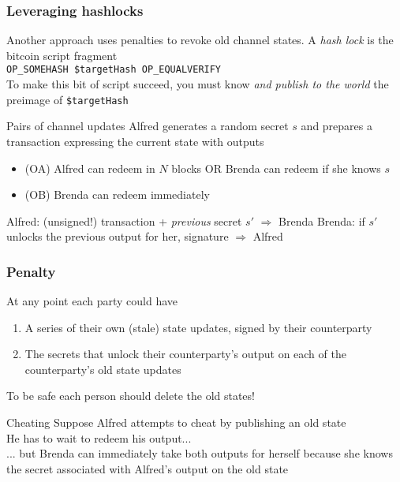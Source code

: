 \documentclass{beamer}
\begin{document}
\begin{frame}
	\frametitle{Leveraging hashlocks}
	Another approach uses penalties to revoke old channel states. \pause
	A \emph{hash lock} is the bitcoin script fragment \\
	{\tiny \texttt{OP\_SOMEHASH \$targetHash OP\_EQUALVERIFY}} \\ \pause
	To make this bit of script succeed, you must know \emph{and publish to the 
	world} the preimage of \texttt{\$targetHash} \pause
	\begin{block}{Pairs of channel updates}
		Alfred generates a random secret $ s $ and prepares a 
		transaction expressing the current state with outputs 
		\pause
		\begin{itemize}
			\item (OA) Alfred can redeem in $ N $ blocks OR Brenda can redeem if she 
				knows $ s $  \pause
			\item (OB) Brenda can redeem immediately \pause
		\end{itemize}
		Alfred:  (unsigned!) transaction + \emph{previous} secret $ s' $ $ \Rightarrow $ Brenda \pause
		Brenda: if $ s' $ unlocks the previous output for her, signature $ \Rightarrow $ Alfred
	\end{block}
\end{frame}
\begin{frame}
	\frametitle{Penalty}
	At any point each party could have \pause
	\begin{enumerate}
		\item A series of their own (stale) state updates, signed by their 
			counterparty \pause
		\item The secrets that unlock their counterparty's output on each of the 
			counterparty's old state updates \pause
	\end{enumerate}
	To be safe each person should delete the old states! \pause
	\begin{block}{Cheating}
	Suppose Alfred attempts to cheat by publishing an old state \\ \pause
	He has to wait to redeem his output... \\ \pause
	... but Brenda can immediately take both outputs for herself because she 
		knows the secret associated with Alfred's output on the old state
	\end{block}
\end{frame}
\end{document}
